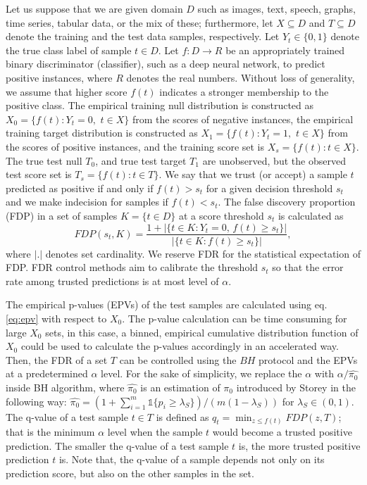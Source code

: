 \documentclass[10pt,letterpaper]{article}
\newcommand{\mathone}{\mathds{1}}
\begin{document}
Let us suppose that we are given domain $D$ such as images, text, speech, graphs, time series, tabular data, or the mix of these; furthermore, let $X\subseteq D$ and $T\subseteq D$ denote the training and  the test data samples, respectively.
Let $Y_t\in\{0,1\}$ denote the true class label of sample $t\in D$.
Let $f:D\rightarrow R$ be an appropriately trained binary discriminator (classifier), such as a deep neural network, to predict positive instances, where $R$ denotes the real numbers.
Without loss of generality, we assume that higher score $f(t)$ indicates a stronger membership to the positive class.
The empirical training null distribution is constructed as $X_0=\{f(t):Y_t = 0,\,\,  t\in X\}$ from the scores of negative instances, the empirical training target distribution is constructed as $X_1=\{f(t): Y_t = 1,\,\,  t\in X\}$ from the scores of positive instances, and the training score set is $X_s=\{f(t): t\in X\}$.
The true test null $T_0$, and true test target $T_1$ are unobserved, but the observed test score set is $ T_s=\{f(t): t\in T\}$.
We say that we trust (or accept) a  sample $t$ predicted as positive if and only if $f(t)>s_t$ for a given decision threshold  $s_t$ and we make indecision for samples if $f(t) < s_t$.
The false discovery proportion (FDP) in a set of samples $K=\{t\in D\}$ at a score threshold $s_t$ is calculated as 
\begin{equation*}
	FDP(s_t,K)=\frac{1+|\{t\in K: Y_t=0,\,f(t)\ge s_t\}|}{|\{t\in K:f(t)\ge s_t\}|},
\end{equation*}
\noindent where $|.|$ denotes set cardinality.
We reserve FDR for the statistical expectation of FDP.
FDR control methods aim to calibrate the threshold  $s_t$ so that the error rate among trusted predictions is at most level of $\alpha$. 

The empirical  p-values (EPVs) of the test samples are calculated using eq. \ref{eq:epv} with respect to $X_0$.
The p-value calculation can be time consuming for large $X_0$ sets, in this case, a binned, empirical cumulative distribution function of $X_0$ could be used to calculate the p-values accordingly in an accelerated way.
Then, the FDR of a set $T$ can be controlled using the $BH$ protocol and the EPVs at a predetermined $\alpha$ level.
For the sake of simplicity, we replace the $\alpha$ with $\alpha/\hat{\pi_0}$ inside BH algorithm, where $\hat{\pi_0}$ is an estimation of $\pi_0$ introduced by Storey \cite{storey2004strong} in the following way: $\hat{\pi_0} = (1+\sum_{i=1}^m \mathone\{p_i\ge\lambda_S\} )/(m(1-\lambda_S))$ for $\lambda_S\in (0,1)$.
The q-value of a test sample $t\in T$ is defined as $q_t=\min_{z\le f(t)}FDP( z, T )$; that is the minimum $\alpha$ level when the sample $t$ would become a trusted positive prediction. 
The smaller the q-value of a test sample $t$ is, the more trusted positive prediction $t$ is.
Note that, the q-value of a sample depends not only on its prediction score, but also on the other samples in the set. 
\end{document}

